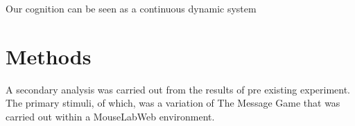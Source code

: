 \documentclass[man, floatsintext]{apa7}
\begin{document}
Our cognition can be seen as a continuous dynamic system












\section{Methods}


%
%
%

A secondary analysis was carried out from the results of pre existing experiment. The primary stimuli, of which, was a variation of The Message Game that was carried out within a MouseLabWeb environment. 
\end{document}
